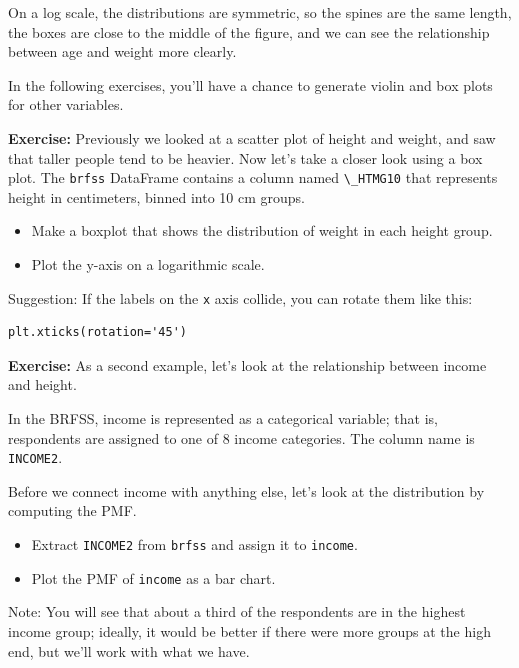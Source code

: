 On a log scale, the distributions are symmetric, so the spines are the
same length, the boxes are close to the middle of the figure, and we can
see the relationship between age and weight more clearly.

In the following exercises, you'll have a chance to generate violin and
box plots for other variables.

\textbf{Exercise:} Previously we looked at a scatter plot of height and
weight, and saw that taller people tend to be heavier. Now let's take a
closer look using a box plot. The \passthrough{\lstinline!brfss!}
DataFrame contains a column named \passthrough{\lstinline!\_HTMG10!}
that represents height in centimeters, binned into 10 cm groups.

\begin{itemize}
\item
  Make a boxplot that shows the distribution of weight in each height
  group.
\item
  Plot the y-axis on a logarithmic scale.
\end{itemize}

Suggestion: If the labels on the \passthrough{\lstinline!x!} axis
collide, you can rotate them like this:

\begin{lstlisting}
plt.xticks(rotation='45')
\end{lstlisting}

\textbf{Exercise:} As a second example, let's look at the relationship
between income and height.

In the BRFSS, income is represented as a categorical variable; that is,
respondents are assigned to one of 8 income categories. The column name
is \passthrough{\lstinline!INCOME2!}.

Before we connect income with anything else, let's look at the
distribution by computing the PMF.

\begin{itemize}
\item
  Extract \passthrough{\lstinline!INCOME2!} from
  \passthrough{\lstinline!brfss!} and assign it to
  \passthrough{\lstinline!income!}.
\item
  Plot the PMF of \passthrough{\lstinline!income!} as a bar chart.
\end{itemize}

Note: You will see that about a third of the respondents are in the
highest income group; ideally, it would be better if there were more
groups at the high end, but we'll work with what we have.

